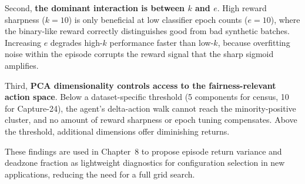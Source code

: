 \documentclass[12pt]{article}
\begin{document}
Second, \textbf{the dominant interaction is between $k$ and $e$}.
High reward sharpness ($k = 10$) is only beneficial at low classifier
epoch counts ($e = 10$), where the binary-like reward correctly
distinguishes good from bad synthetic batches.
Increasing $e$ degrades high-$k$ performance faster than low-$k$,
because overfitting noise within the episode corrupts the reward signal
that the sharp sigmoid amplifies.

Third, \textbf{PCA dimensionality controls access to the fairness-relevant
action space}. Below a dataset-specific threshold (5 components for census,
10 for Capture-24), the agent's delta-action walk cannot reach the
minority-positive cluster, and no amount of reward sharpness or epoch
tuning compensates.
Above the threshold, additional dimensions offer diminishing returns.

These findings are used in Chapter~8 to propose episode return variance and
deadzone fraction as lightweight diagnostics for configuration selection in
new applications, reducing the need for a full grid search.
\end{document}

